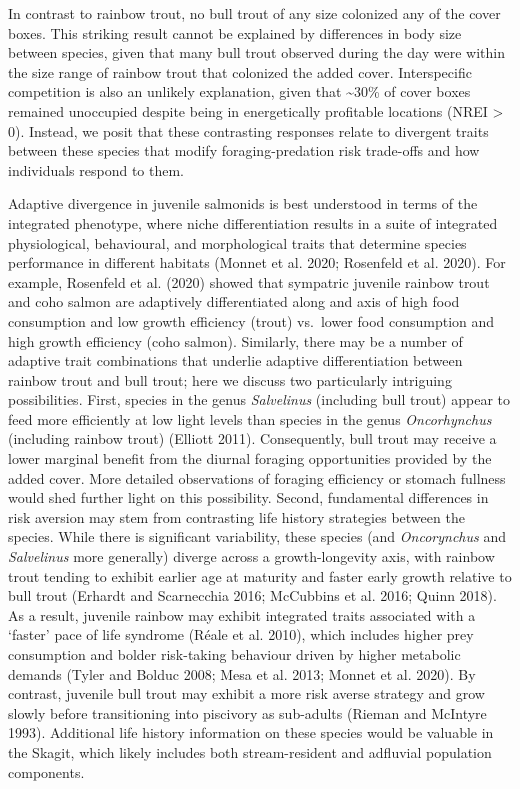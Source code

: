 \documentclass[]{article}
\begin{document}
In contrast to rainbow trout, no bull trout of any size colonized any of
the cover boxes. This striking result cannot be explained by differences
in body size between species, given that many bull trout observed during
the day were within the size range of rainbow trout that colonized the
added cover. Interspecific competition is also an unlikely explanation,
given that \textasciitilde{}30\% of cover boxes remained unoccupied
despite being in energetically profitable locations (NREI \textgreater{}
0). Instead, we posit that these contrasting responses relate to
divergent traits between these species that modify foraging-predation
risk trade-offs and how individuals respond to them.

Adaptive divergence in juvenile salmonids is best understood in terms of
the integrated phenotype, where niche differentiation results in a suite
of integrated physiological, behavioural, and morphological traits that
determine species performance in different habitats (Monnet et al. 2020;
Rosenfeld et al. 2020). For example, Rosenfeld et al. (2020) showed that
sympatric juvenile rainbow trout and coho salmon are adaptively
differentiated along and axis of high food consumption and low growth
efficiency (trout) vs.~lower food consumption and high growth efficiency
(coho salmon). Similarly, there may be a number of adaptive trait
combinations that underlie adaptive differentiation between rainbow
trout and bull trout; here we discuss two particularly intriguing
possibilities. First, species in the genus \emph{Salvelinus} (including
bull trout) appear to feed more efficiently at low light levels than
species in the genus \emph{Oncorhynchus} (including rainbow trout)
(Elliott 2011). Consequently, bull trout may receive a lower marginal
benefit from the diurnal foraging opportunities provided by the added
cover. More detailed observations of foraging efficiency or stomach
fullness would shed further light on this possibility. Second,
fundamental differences in risk aversion may stem from contrasting life
history strategies between the species. While there is significant
variability, these species (and \emph{Oncorynchus} and \emph{Salvelinus}
more generally) diverge across a growth-longevity axis, with rainbow
trout tending to exhibit earlier age at maturity and faster early growth
relative to bull trout (Erhardt and Scarnecchia 2016; McCubbins et al.
2016; Quinn 2018). As a result, juvenile rainbow may exhibit integrated
traits associated with a `faster' pace of life syndrome (Réale et al.
2010), which includes higher prey consumption and bolder risk-taking
behaviour driven by higher metabolic demands (Tyler and Bolduc 2008;
Mesa et al. 2013; Monnet et al. 2020). By contrast, juvenile bull trout
may exhibit a more risk averse strategy and grow slowly before
transitioning into piscivory as sub-adults (Rieman and McIntyre 1993).
Additional life history information on these species would be valuable
in the Skagit, which likely includes both stream-resident and adfluvial
population components.
\end{document}

